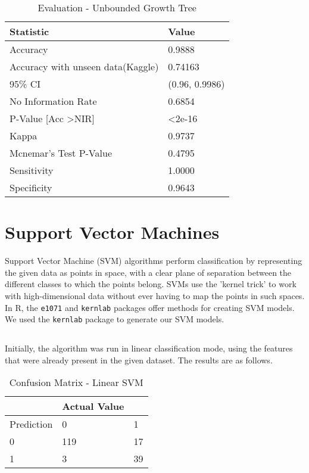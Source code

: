 \documentclass[a4paper,10pt]{report}\usepackage[]{graphicx}\usepackage[]{color}
\begin{document}
\begin{table}
    \begin{tabular}{|l|l|}
    \hline
    Statistic              & Value           \\ \hline
    Accuracy               & 0.9888          \\
    Accuracy with unseen data(Kaggle)               & 0.74163 \\ 
    95\% CI                & (0.96, 0.9986) \\
    No Information Rate    & 0.6854          \\
    P-Value [Acc \textgreater NIR]    &  \textless2e-16      \\
    Kappa                  &  0.9737         \\
    Mcnemar's Test P-Value & 0.4795          \\
    Sensitivity            &  1.0000         \\
    Specificity            & 0.9643          \\ \hline
    \end{tabular}
    \caption{Evaluation - Unbounded Growth Tree}
\end{table}


\section{Support Vector Machines}

Support Vector Machine (SVM) algorithms perform classification by representing the given data as points in space, with a clear plane of separation between the different classes to which the points belong. SVMs use the 'kernel trick' to work with high-dimensional data without ever having to map the points in such spaces. 
In R, the \texttt{e1071} and \texttt{kernlab} packages offer methods for creating SVM models. We used the \texttt{kernlab} package to generate our SVM models.

\subsection{}
Initially, the algorithm was run in linear classification mode, using the features that were already present in the given dataset. The results are as follows.
\begin{table}
    \begin{tabular}{|l|l|l|}
    \hline
    ~          & Actual Value  & ~  \\ \hline
    Prediction & 0             & 1  \\ \hline
    0          & 119           & 17 \\
    1          & 3             & 39 \\ \hline
    \end{tabular}
    \caption{Confusion Matrix - Linear SVM}
\end{table}
\end{document}
